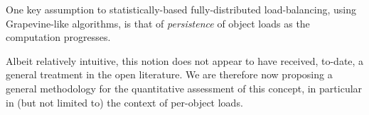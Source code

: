 One key assumption to statistically-based fully-distributed
load-balancing, using Grapevine-like algorithms, is that of
\emph{persistence} of object loads as the computation progresses.

Albeit relatively intuitive, this notion does not appear to have
received, to-date, a general treatment in the open literature.
We are therefore now proposing a general methodology for the
quantitative assessment of this concept, in particular in (but not
limited to) the context of per-object loads.

